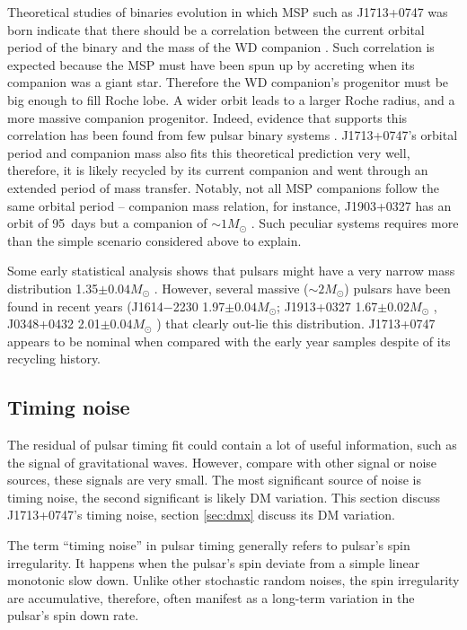 Theoretical studies of binaries evolution in which MSP such as J1713+0747 was born  
indicate that there should be a correlation between the current orbital period
of the binary and the mass of the WD companion \citep{rpj+95, ts99a, prp02b}
. Such correlation is expected because the MSP must have been spun up by
accreting when its companion was a giant star. Therefore the WD
companion's progenitor must be big enough to fill Roche lobe. A wider
orbit leads to a larger Roche radius, and a more massive companion progenitor.
Indeed, evidence that supports this correlation has been found from few pulsar
binary systems \citep{vbb+01, ktr94}.  
J1713+0747's orbital period and companion mass also fits this theoretical
prediction very well, therefore, it is likely recycled by its current
companion and went through an extended period of mass transfer.
Notably, not all MSP companions follow the same orbital period -- companion
mass relation, for instance, J1903+0327 has an orbit of 95~days but a
companion of $\sim 1M_{\odot}$ \citep{fbw+11}. Such peculiar systems requires
more than the simple scenario considered above to explain.

Some early statistical analysis shows that pulsars 
might have a very narrow mass distribution 1.35$\pm0.04M_{\odot}$ \citep{tc99}. 
However, several massive ($\sim2M_{\odot}$) pulsars have been found in recent
years (J1614$-$2230 1.97$\pm0.04M_{\odot}$\citealt{dpr+10}; J1913+0327
1.67$\pm0.02M_{\odot}$ \citealt{fbw+11}, J0348+0432 2.01$\pm0.04M_{\odot}$
\citealt{afw+13}) that clearly out-lie this distribution.
J1713+0747 appears to be nominal when compared with the early year samples
despite of its recycling history.

\subsection{Timing noise}
\label{sec:noise}
The residual of pulsar timing fit could contain a lot of useful information,
such as the signal of gravitational waves. However, compare with other signal
or noise sources, these signals are very small. The most significant source of
noise is timing noise, the second significant is likely DM variation. This
section discuss J1713+0747's timing noise, section \ref{sec:dmx} discuss its DM
variation.


The term ``timing noise'' in pulsar timing generally refers to pulsar's spin irregularity.
It happens when the pulsar's spin deviate from a simple linear monotonic slow down.
Unlike other stochastic random noises, the spin irregularity are accumulative, therefore, often manifest as a long-term variation in the pulsar's spin down rate.


